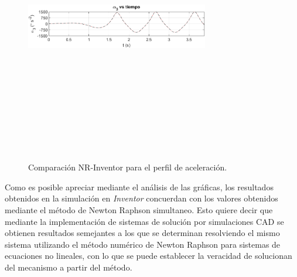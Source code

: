 \documentclass[12pt]{article}
\begin{document}
        \vspace{-25pt}
        \begin{figure} [H]
        \centerline{\includegraphics[width=8cm, height=12cm,keepaspectratio]{Inventor vs NR/alpha3 vs inventor.png}}
        \caption{Comparación NR-Inventor para el perfil de aceleración.}
        \label{}
    \end{figure}
Como es posible apreciar mediante el análisis de las gráficas, los resultados obtenidos en la simulación en \textit{Inventor} concuerdan con los valores obtenidos mediante el método de Newton Raphson simultaneo. Esto quiere decir que mediante la implementación de sistemas de solución por simulaciones CAD se obtienen resultados semejantes a los que se determinan resolviendo el mismo sistema utilizando el método numérico de Newton Raphson para sistemas de ecuaciones no lineales, con lo que se puede establecer la veracidad de solucionan del mecanismo a partir del método.
\end{document}
